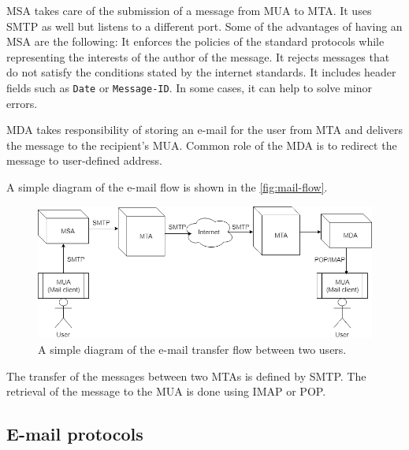 MSA takes care of the submission of a message from MUA to MTA. It uses SMTP as well but listens to a different port. Some of the advantages of having an MSA are the following: It enforces the policies of the standard protocols while representing the interests of the author of the message. It rejects messages that do not satisfy the conditions stated by the internet standards. It includes header fields such as \texttt{Date} or \texttt{Message-ID}. In some cases, it can help to solve minor errors.

MDA takes responsibility of storing an e-mail for the user from MTA and delivers the message to the recipient's MUA. Common role of the MDA is to redirect the message to user-defined address. 

A simple diagram of the e-mail flow is shown in the \autoref{fig:mail-flow}.
 \begin{figure}
\centering
\includegraphics[width=\textwidth]{img/mail_flow.png}
\caption{A simple diagram of the e-mail transfer flow between two users.}
\label{fig:mail-flow}
\end{figure}
The transfer of the messages between two MTAs is defined by SMTP. The retrieval of the message to the MUA is done using IMAP or POP.

\subsection{E-mail protocols}
